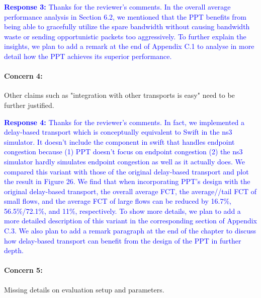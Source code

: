 \documentclass[12pt,one-column]{article}
\begin{document}
\noindent\textcolor{blue}{\textbf{Response 3:} 
Thanks for the reviewer’s comments. 
In the overall average performance analysis in Section 6.2, we mentioned that the PPT benefits from being able to gracefully utilize the spare bandwidth without causing bandwidth waste or sending opportunistic packets too aggressively.
To further explain the insights, we plan to add a remark at the end of Appendix C.1 to analyse in more detail how the PPT achieves its superior performance.
}

{\it \paragraph{Concern 4:} Other claims such as "integration with other transports is easy" need to be further justified.}


\noindent\textcolor{blue}{\textbf{Response 4:} 
Thanks for the reviewer’s comments. 
In fact, we implemented a delay-based transport which is conceptually equivalent to Swift in the ns3 simulator.
It doesn't include the component in swift that handles endpoint congestion because (1) PPT doesn't focus on endpoint congestion (2) the ns3 simulator hardly simulates endpoint congestion as well as it actually does. 
We compared this variant with those of the original delay-based transport and plot the result in Figure 26.
We find that when incorporating PPT's design with the original delay-based transport, the overall average FCT, the average//tail FCT of small flows, and the average FCT of large flows can be reduced by 16.7\%, 56.5\%/72.1\%, and 11\%, respectively.
To show more details, we plan to add a more detailed description of this variant in the corresponding section of Appendix C.3.
We also plan to add a remark paragraph at the end of the chapter to discuss how delay-based transport can benefit from the design of the PPT in further depth.
}

{\it \paragraph{Concern 5:}Missing details on evaluation setup and parameters.}
\end{document}
